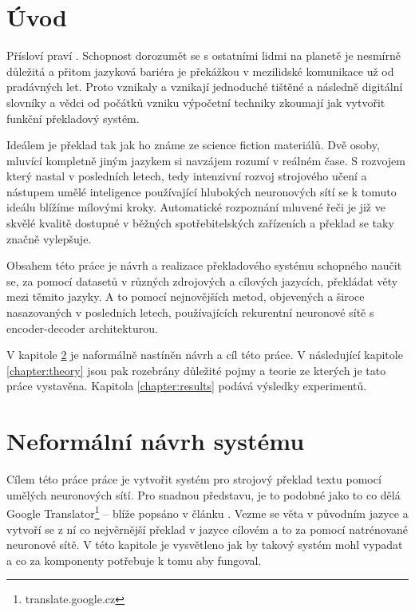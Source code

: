 \chapter{Úvod}
Přísloví praví . Schopnost dorozumět se s ostatními lidmi na planetě je nesmírně důležitá a přitom jazyková bariéra je překážkou v mezilidské komunikace už od pradávných let. Proto vznikaly a vznikají jednoduché tištěné a následně digitální slovníky a vědci od počátků vzniku výpočetní techniky zkoumají jak vytvořit funkční překladový systém.

Ideálem je překlad tak jak ho známe ze science fiction materiálů. Dvě osoby, mluvící kompletně jiným jazykem si navzájem rozumí v reálném čase. S rozvojem který nastal v posledních letech, tedy intenzivní rozvoj strojového učení a nástupem umělé inteligence používající hlubokých neuronových sítí se k tomuto ideálu blížíme mílovými kroky. Automatické rozpoznání mluvené řeči je již ve skvělé kvalitě dostupné v běžných spotřebitelských zařízeních a překlad se taky značně vylepšuje.

Obsahem této práce je návrh a realizace překladového systému schopného naučit se, za pomocí datasetů v různých zdrojových a cílových jazycích, překládat věty mezi těmito jazyky. A to pomocí nejnovějších metod, objevených a široce nasazovaných v posledních letech, používajících rekurentní neuronové sítě s encoder-decoder architekturou.

V kapitole \ref{chapter:draft} je naformálně nastíněn návrh a cíl této práce. V následující kapitole \ref{chapter:theory} jsou pak rozebrány důležité pojmy a teorie ze kterých je tato práce vystavěna. Kapitola \ref{chapter:results} podává výsledky experimentů.

\chapter{Neformální návrh systému} \label{chapter:draft}
Cílem této práce práce je vytvořit systém pro strojový překlad textu pomocí umělých neuronových sítí. Pro snadnou představu, je to podobné jako to co dělá Google Translator\footnote{translate.google.cz} -- blíže popsáno v článku \cite{googleBridgingGap}. Vezme se věta v původním jazyce a vytvoří se z ní co nejvěrnější překlad v jazyce cílovém a to za pomocí natrénované neuronové sítě. V této kapitole je vysvětleno jak by takový systém mohl vypadat a co za komponenty potřebuje k tomu aby fungoval.

